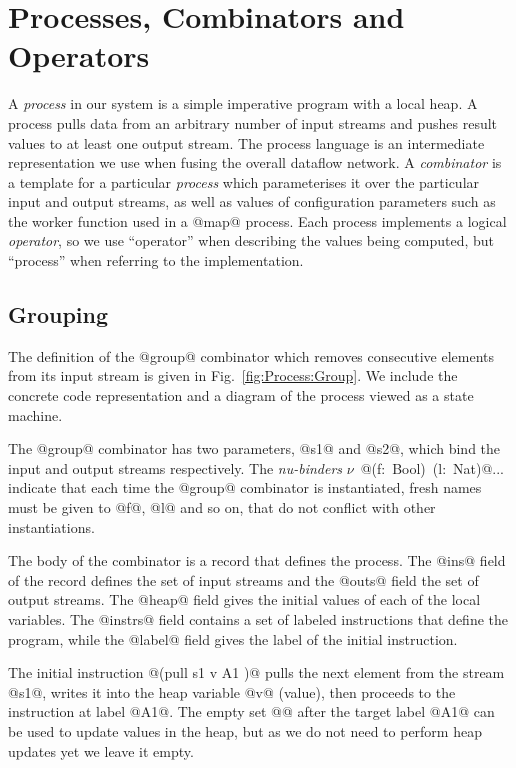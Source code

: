 \section{Processes, Combinators and Operators}
\label{s:Processes}

A \emph{process} in our system is a simple imperative program with a local heap. A process pulls data from an arbitrary number of input streams and pushes result values to at least one output stream. The process language is an intermediate representation we use when fusing the overall dataflow network. A \emph{combinator} is a template for a particular \emph{process} which parameterises it over the particular input and output streams, as well as values of configuration parameters such as the worker function used in a @map@ process. Each process implements a logical \emph{operator}, so we use ``operator'' when describing the values being computed, but ``process'' when referring to the implementation. 

\subsection{Grouping}

The definition of the @group@ combinator which removes consecutive elements from its input stream is given in Fig.~\ref{fig:Process:Group}. We include the concrete code representation and a diagram of the process viewed as a state machine.

The @group@ combinator has two parameters, @s1@ and @s2@, which bind the input and output streams respectively. The \emph{nu-binders} \mbox{$\nu$ @(f: Bool) (l: Nat)@...} indicate that each time the @group@ combinator is instantiated, fresh names must be given to @f@, @l@ and so on, that do not conflict with other instantiations. 

The body of the combinator is a record that defines the process. The @ins@ field of the record defines the set of input streams and the @outs@ field the set of output streams. The @heap@ field gives the initial values of each of the local variables. The @instrs@ field contains a set of labeled instructions that define the program, while the @label@ field gives the label of the initial instruction. 

The initial instruction @(pull s1 v A1 {})@ pulls the next element from the stream @s1@, writes it into the heap variable @v@ (value), then proceeds to the instruction at label @A1@. The empty set @{}@ after the target label @A1@ can be used to update values in the heap, but as we do not need to perform heap updates yet we leave it empty. 

